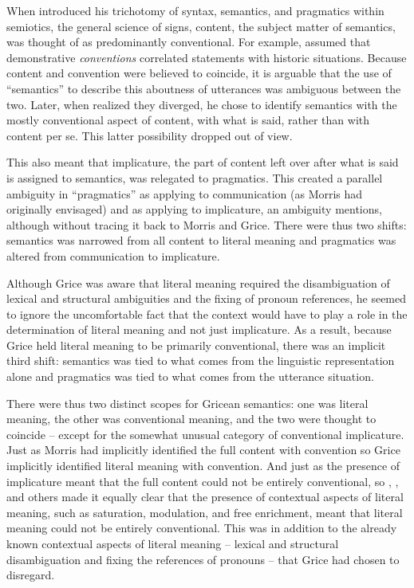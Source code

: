 When \citet{morris:fts} introduced his trichotomy of syntax, semantics, and pragmatics within semiotics, the general science of signs, content, the subject matter of semantics, was thought of as predominantly conventional. For example, \citet{austin:t} assumed that demonstrative \emph{conventions} correlated statements with historic situations. Because content and convention were believed to coincide, it is arguable that the use of ``semantics'' to describe this aboutness of utterances was ambiguous between the two. Later, when \citet{grice:lc} realized they diverged, he chose to identify semantics with the mostly conventional aspect of content, with what is said, rather than with content per se. This latter possibility dropped out of view.

This also meant that implicature, the part of content left over after what is said is assigned to semantics, was relegated to pragmatics. This created a parallel ambiguity in ``pragmatics'' as applying to communication (as Morris had originally envisaged) and as applying to implicature, an ambiguity \citet[Section~4]{devitt:wmps} mentions, although without tracing it back to Morris and Grice. There were thus two shifts: semantics was narrowed from all content to literal meaning and pragmatics was altered from communication to implicature. 

Although Grice was aware that literal meaning required the disambiguation of lexical and structural ambiguities and the fixing of pronoun references, he seemed to ignore the uncomfortable fact that the context would have to play a role in the determination of literal meaning and not just implicature. As a result, because Grice held literal meaning to be primarily conventional, there was an implicit third shift: semantics was tied to what comes from the linguistic representation alone and pragmatics was tied to what comes from the utterance situation.

There were thus two distinct scopes for Gricean semantics: one was literal meaning, the other was conventional meaning, and the two were thought to coincide -- except for the somewhat unusual category of conventional implicature.  Just as Morris had implicitly identified the full content with convention so Grice implicitly identified  literal meaning with convention. And just as the presence of implicature meant that the full content could not be entirely conventional, so \citet{searle:lm}, \citet{cohen:pa, cohen:ci}, and others made it equally clear that the presence of contextual aspects of literal meaning, such as saturation, modulation, and free enrichment, meant that literal meaning could not be entirely conventional. This was in addition to the already known contextual aspects of literal meaning -- lexical and structural disambiguation and fixing the references of pronouns -- that Grice had chosen to disregard.

